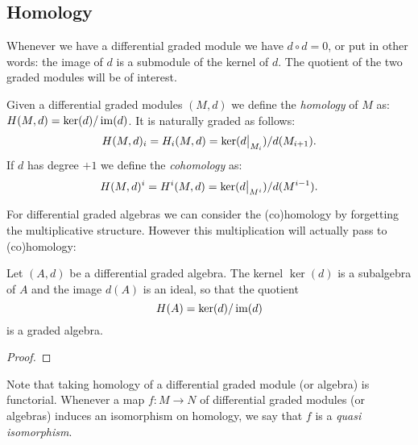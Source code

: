 \subsection{Homology}

Whenever we have a differential graded module we have $d \circ d = 0$, or put in other words: the image of $d$ is a submodule of the kernel of $d$. The quotient of the two graded modules will be of interest.

\begin{definition}
	Given a differential graded modules $(M, d)$ we define the \emph{homology} of $M$ as: $H(M, d) = \ker(d) / \operatorname*{im}(d)$.
	It is naturally graded as follows:
	$$ H(M, d)_i = H_i(M, d) = \ker(\restr{d}{M_i}) / d(M_{i+1}). $$
	If $d$ has degree $+1$ we define the \emph{cohomology} as:
	$$ H(M, d)^i = H^i(M, d) = \ker(\restr{d}{M^i}) / d(M^{i-1}). $$
\end{definition}

For differential graded algebras we can consider the (co)homology by forgetting the multiplicative structure. However this multiplication will actually pass to (co)homology:

\begin{lemma}
	Let $(A, d)$ be a differential graded algebra. The kernel $\ker(d)$ is a subalgebra of $A$ and the image $d(A)$ is an ideal, so that the quotient
	$$ H(A) = \ker(d) / \operatorname*{im}(d) $$
	is a graded algebra.
\end{lemma}
\begin{proof}
\end{proof}

Note that taking homology of a differential graded module (or algebra) is functorial. Whenever a map $f: M \to N$ of differential graded modules (or algebras) induces an isomorphism on homology, we say that $f$ is a \emph{quasi isomorphism}.

